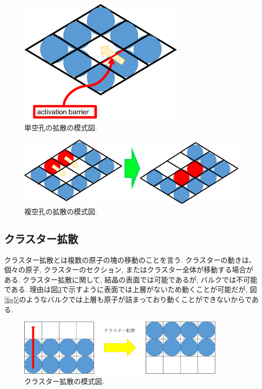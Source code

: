 \begin{figure}[htbp]
	\begin{center}
		\includegraphics[width=80mm]{../intro/monovacancy.png}
        \caption{単空孔の拡散の模式図.}
		\label{fig2}
	\end{center}
\end{figure}

\begin{figure}[htbp]
	\begin{center}
		\includegraphics[width=130mm]{../intro/divacancy.png}
        \caption{複空孔の拡散の模式図.}
		\label{fig3}
	\end{center}
\end{figure}


\subsection{クラスター拡散}
クラスター拡散とは複数の原子の塊の移動のことを言う. クラスターの動きは、個々の原子, クラスターのセクション, またはクラスター全体が移動する場合がある.
クラスター拡散に関して, 結晶の表面では可能であるが, バルクでは不可能である.
理由は図\ref{fig4}で示すように表面では上層がないため動くことが可能だが, 図\ref{fig5}のようなバルクでは上層も原子が詰まっており動くことができないからである.

\begin{figure}[htbp]
	\begin{center}
		\includegraphics[width=100mm]{../intro/kakusan.png}
		\caption{クラスター拡散の模式図.}
		\label{fig4}
	\end{center}
\end{figure}

